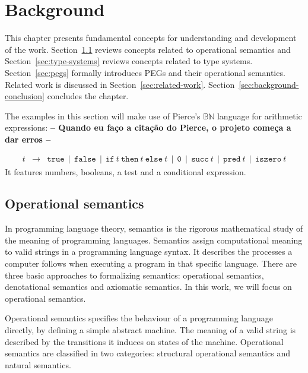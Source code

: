 \chapter{Background}\label{chap:background}

This chapter presents fundamental concepts for understanding and development of the
work. Section~\ref{sec:operational-semantics} reviews concepts related to operational
semantics and Section~\ref{sec:type-systems} reviews concepts related to type systems.
Section~\ref{sec:pegs} formally introduces PEGs and their operational semantics.
Related work is discussed in Section~\ref{sec:related-work}.
Section~\ref{sec:background-conclusion} concludes the chapter.

The examples in this section will make use of Pierce's
\(\mathbb{B}\mathbb{N}\) language for arithmetic expressions:
\textbf{-- Quando eu faço a citação do Pierce, o projeto começa a dar erros --}

\[
    \begin{array}{lcl}
        t & \to & \texttt{true} \, \mid \, \texttt{false} \,
                \mid \, \texttt{if} \: t \: \texttt{then} \: t \: \texttt{else} \: t \,
                \mid \, \texttt{0} \, \mid \, \texttt{succ} \: t \,
                \mid \, \texttt{pred} \: t \, \mid \, \texttt{iszero} \: t
    \end{array}
\]
It features numbers, booleans, a test and a conditional expression.

\section{Operational semantics}\label{sec:operational-semantics}

In programming language theory, semantics is the rigorous mathematical study of
the meaning of programming languages. Semantics assign computational meaning to
valid strings in a programming language syntax. It describes the processes a
computer follows when executing a program in that specific language. There are
three basic approaches to formalizing semantics: operational semantics, denotational
semantics and axiomatic semantics.
In this work, we will focus on operational semantics.

Operational semantics specifies the behaviour of a programming language directly,
by defining a simple abstract machine. The meaning of a valid string is described
by the transitions it induces on states of the machine. Operational semantics
are classified in two categories: structural operational semantics and natural
semantics.

